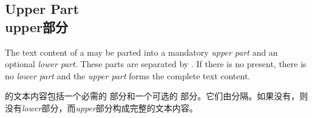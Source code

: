 \setcounter{section}{4}
\setcounter{subsection}{2}
\setcounter{subsubsection}{0}
\subsection{Upper Part\\upper部分} 

The text content of a  may be parted into a mandatory \emph{upper part}
and an optional \emph{lower part}. These parts are separated by
. If there is no  present, there is no
\emph{lower part} and the \emph{upper part} forms the complete text content.


 的文本内容包括一个必需的  部分和一个可选的
 部分。它们由分隔。如果没有，则没有\emph{lower}部分，而\emph{upper}部分构成完整的文本内容。

